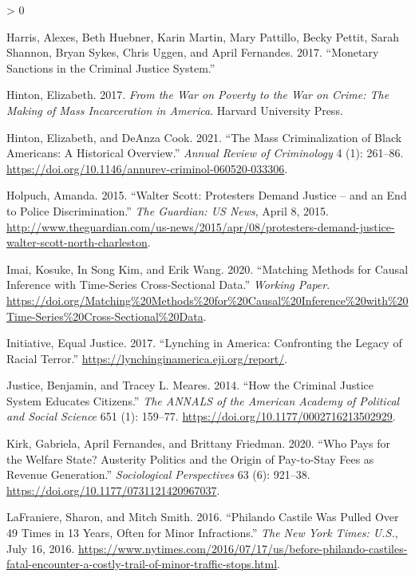 \documentclass[
  12pt,
]{article}
\newlength{\cslhangindent}
\newenvironment{CSLReferences}[2] %
 {%
  \setlength{\parindent}{0pt}
  \ifodd #1 \everypar{\setlength{\hangindent}{\cslhangindent}}\ignorespaces\fi
  \ifnum #2 > 0
  \setlength{\parskip}{#2\baselineskip}
  \fi
 }%
 {}
\begin{document}
\begin{CSLReferences}{1}{0}
\leavevmode\hypertarget{ref-Harris2017}{}%
Harris, Alexes, Beth Huebner, Karin Martin, Mary Pattillo, Becky Pettit, Sarah Shannon, Bryan Sykes, Chris Uggen, and April Fernandes. 2017. {``Monetary {Sanctions} in the {Criminal Justice System}.''}

\leavevmode\hypertarget{ref-Hinton2017}{}%
Hinton, Elizabeth. 2017. \emph{From the {War} on {Poverty} to the {War} on {Crime}: {The Making} of {Mass Incarceration} in {America}}. {Harvard University Press}.

\leavevmode\hypertarget{ref-Hinton2021}{}%
Hinton, Elizabeth, and DeAnza Cook. 2021. {``The {Mass Criminalization} of {Black Americans}: {A Historical Overview}.''} \emph{Annual Review of Criminology} 4 (1): 261--86. \url{https://doi.org/10.1146/annurev-criminol-060520-033306}.

\leavevmode\hypertarget{ref-Holpuch2015}{}%
Holpuch, Amanda. 2015. {``Walter {Scott}: Protesters Demand Justice -- and an End to Police Discrimination.''} \emph{The Guardian: US News}, April 8, 2015. \url{http://www.theguardian.com/us-news/2015/apr/08/protesters-demand-justice-walter-scott-north-charleston}.

\leavevmode\hypertarget{ref-Imai2020}{}%
Imai, Kosuke, In Song Kim, and Erik Wang. 2020. {``Matching {Methods} for {Causal Inference} with {Time}-{Series Cross}-{Sectional Data}.''} \emph{Working Paper}. \url{https://doi.org/Matching\%20Methods\%20for\%20Causal\%20Inference\%20with\%20Time-Series\%20Cross-Sectional\%20Data}.

\leavevmode\hypertarget{ref-EqualJusticeInitiative2017}{}%
Initiative, Equal Justice. 2017. {``Lynching in {America}: {Confronting} the {Legacy} of {Racial Terror}.''} \url{https://lynchinginamerica.eji.org/report/}.

\leavevmode\hypertarget{ref-Justice2014}{}%
Justice, Benjamin, and Tracey L. Meares. 2014. {``How the {Criminal Justice System Educates Citizens}.''} \emph{The ANNALS of the American Academy of Political and Social Science} 651 (1): 159--77. \url{https://doi.org/10.1177/0002716213502929}.

\leavevmode\hypertarget{ref-Kirk2020}{}%
Kirk, Gabriela, April Fernandes, and Brittany Friedman. 2020. {``Who {Pays} for the {Welfare State}? {Austerity Politics} and the {Origin} of {Pay}-to-{Stay Fees} as {Revenue Generation}.''} \emph{Sociological Perspectives} 63 (6): 921--38. \url{https://doi.org/10.1177/0731121420967037}.

\leavevmode\hypertarget{ref-LaFraniere2016}{}%
LaFraniere, Sharon, and Mitch Smith. 2016. {``Philando {Castile Was Pulled Over} 49 {Times} in 13 {Years}, {Often} for {Minor Infractions}.''} \emph{The New York Times: U.S.}, July 16, 2016. \url{https://www.nytimes.com/2016/07/17/us/before-philando-castiles-fatal-encounter-a-costly-trail-of-minor-traffic-stops.html}.


\end{CSLReferences}
\end{document}
